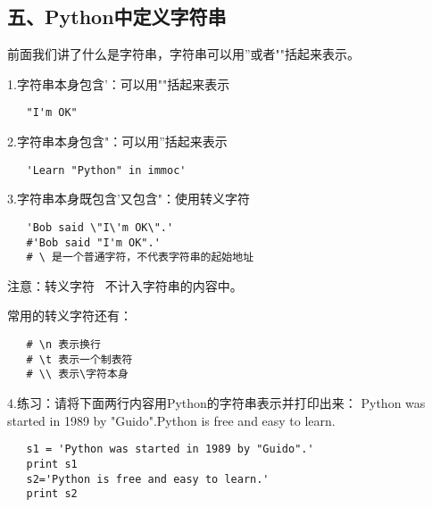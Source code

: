 \documentclass{article}
\begin{document}
\begin{CJK}{UTF8}{gbsn}
\part*{五、Python中定义字符串}
\subparagraph*{}
前面我们讲了什么是字符串，字符串可以用''或者""括起来表示。
\subparagraph*{}
1.字符串本身包含'：可以用""括起来表示
\begin{verbatim}
   "I'm OK"
\end{verbatim}
\subparagraph*{}
2.字符串本身包含"：可以用''括起来表示
\begin{verbatim}
   'Learn "Python" in immoc'
\end{verbatim}
\subparagraph*{}
3.字符串本身既包含'又包含"：使用转义字符
\begin{verbatim}
   'Bob said \"I\'m OK\".'
   #'Bob said "I'm OK".'
   # \ 是一个普通字符，不代表字符串的起始地址
\end{verbatim}
\subparagraph*{}
注意：转义字符 \ 不计入字符串的内容中。
\subparagraph*{}
常用的转义字符还有：
\begin{verbatim}
   # \n 表示换行
   # \t 表示一个制表符
   # \\ 表示\字符本身
\end{verbatim}
\subparagraph*{}
4.练习：请将下面两行内容用Python的字符串表示并打印出来：
Python was started in 1989 by "Guido".Python is free and easy to learn.
\begin{verbatim}
   s1 = 'Python was started in 1989 by "Guido".'
   print s1
   s2='Python is free and easy to learn.'
   print s2
\end{verbatim}

\end{CJK}
\end{document}
